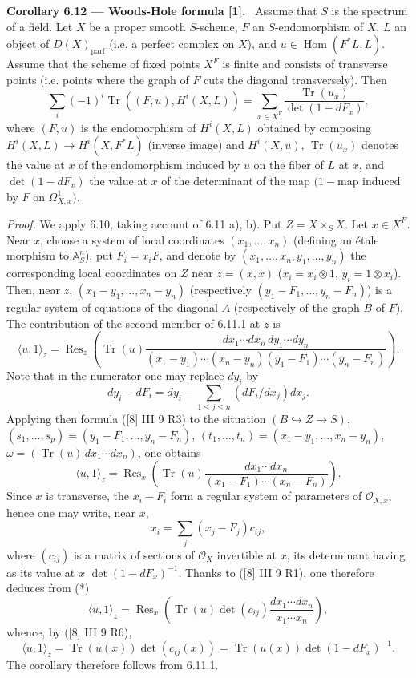 \documentclass[11pt]{article}
\newenvironment{statement}[1]{\par\medskip\noindent\textbf{#1.}\ }{\par\medskip}
\DeclareMathOperator{\Hom}{Hom}
\providecommand{\Tr}{\operatorname{Tr}}
\providecommand{\parf}{\mathrm{parf}}
\providecommand{\OO}{\mathcal O}
\providecommand{\Res}{\operatorname{Res}}
\begin{document}
\begin{statement}{Corollary 6.12 --- Woods-Hole formula [1]}
Assume that $S$ is the spectrum of a field. Let $X$ be a proper smooth $S$-scheme, $F$ an $S$-endomorphism of $X$, $L$ an object of $D(X)_{\parf}$ (i.e. a perfect complex on $X$), and $u\in\Hom(F^*L,L)$. Assume that the scheme of fixed points $X^F$ is finite and consists of transverse points (i.e. points where the graph of $F$ cuts the diagonal transversely). Then
\begin{equation}
\tag{6.12.1}
\sum_i(-1)^i\Tr((F,u),H^i(X,L))=
\sum_{x\in X^F}\frac{\Tr(u_x)}{\det(1-dF_x)},
\end{equation}
where $(F,u)$ is the endomorphism of $H^i(X,L)$ obtained by composing $H^i(X,L)\to H^i(X,F^*L)$ (inverse image) and $H^i(X,u)$, $\Tr(u_x)$ denotes the value at $x$ of the endomorphism induced by $u$ on the fiber of $L$ at $x$, and $\det(1-dF_x)$ the value at $x$ of the determinant of the map $(1-$map induced by $F$ on $\Omega^1_{X,x})$.

\emph{Proof.} We apply 6.10, taking account of 6.11 a), b). Put $Z=X\times_SX$. Let $x\in X^F$. Near $x$, choose a system of local coordinates $(x_1,\ldots,x_n)$ (defining an étale morphism to $\mathbb A^n_S$), put $F_i=x_iF$, and denote by $(x_1,\ldots,x_n,y_1,\ldots,y_n)$ the corresponding local coordinates on $Z$ near $z=(x,x)$ ($x_i=x_i\otimes1$, $y_i=1\otimes x_i$). Then, near $z$, $(x_1-y_1,\ldots,x_n-y_n)$ (respectively $(y_1-F_1,\ldots,y_n-F_n)$) is a regular system of equations of the diagonal $A$ (respectively of the graph $B$ of $F$). The contribution of the second member of 6.11.1 at $z$ is
\[
\langle u,1\rangle_z=\Res_z\left(\Tr(u)\frac{dx_1\cdots dx_n\,dy_1\cdots dy_n}{(x_1-y_1)\cdots(x_n-y_n)(y_1-F_1)\cdots(y_n-F_n)}\right).
\]
Note that in the numerator one may replace $dy_i$ by
\[
dy_i-dF_i=dy_i-\sum_{1\le j\le n}(dF_i/dx_j)dx_j.
\]
Applying then formula ([8] III 9 R3) to the situation $(B\hookrightarrow Z\to S)$, $(s_1,\ldots,s_p)=(y_1-F_1,\ldots,y_n-F_n)$, $(t_1,\ldots,t_n)=(x_1-y_1,\ldots,x_n-y_n)$, $\omega=(\Tr(u)\,dx_1\cdots dx_n)$, one obtains
\begin{equation}
\tag{*}
\langle u,1\rangle_z=\Res_x\left(\Tr(u)\frac{dx_1\cdots dx_n}{(x_1-F_1)\cdots(x_n-F_n)}\right).
\end{equation}
Since $x$ is transverse, the $x_i-F_i$ form a regular system of parameters of $\OO_{X,x}$, hence one may write, near $x$,
\[
x_i=\sum_j(x_j-F_j)c_{ij},
\]
where $(c_{ij})$ is a matrix of sections of $\OO_X$ invertible at $x$, its determinant having as its value at $x$ $\det(1-dF_x)^{-1}$. Thanks to ([8] III 9 R1), one therefore deduces from (*)
\[
\langle u,1\rangle_z=\Res_x\left(\Tr(u)\det(c_{ij})\frac{dx_1\cdots dx_n}{x_1\cdots x_n}\right),
\]
whence, by ([8] III 9 R6),
\[
\langle u,1\rangle_z=\Tr(u(x))\det(c_{ij}(x))=\Tr(u(x))\det(1-dF_x)^{-1}.
\]
The corollary therefore follows from 6.11.1.
\end{statement}
\end{document}
